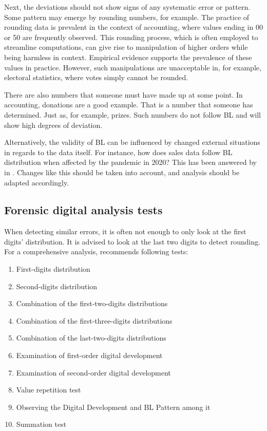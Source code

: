 Next, the deviations should not show signs of any systematic error or pattern. Some pattern may emerge by rounding numbers, for example. The practice of rounding data is prevalent in the context of accounting, where values ending in 00 or 50 are frequently observed. This rounding process, which is often employed to streamline computations, can give rise to manipulation of higher orders while being harmless in context. Empirical evidence supports the prevalence of these values in practice. %
However, such manipulations are unacceptable in, for example, electoral statistics, where votes simply cannot be rounded.
\cite{kossovsky2014benford}


There are also numbers that someone must have made up at some point. In accounting, donations are a good example. That is a number that someone has determined. Just as, for example, prizes. Such numbers do not follow BL and will show high degrees of deviation. \cite{kossovsky2014benford}

Alternatively, the validity of BL can be influenced by changed external situations in regards to the data itself. For instance, how does sales data follow BL distribution when affected by the pandemic in 2020? This has been answered by \citeauthor{Hronova2023} in \citeyear{Hronova2023}. Changes like this should be taken into account, and analysis should be adapted accordingly.


\subsection{Forensic digital analysis tests}

When detecting similar errors, it is often not enough to only look at the first digits' distribution. It is advised to look at the last two digits to detect rounding. For a comprehensive analysis, \citeauthor{kossovsky2014benford} recommends following tests:

\begin{enumerate}
    \item First-digits distribution
    \item Second-digits distribution
    \item Combination of the first-two-digits distributions
    \item Combination of the first-three-digits distributions
    \item Combination of the last-two-digits distributions 
    \item Examination of first-order digital development
    \item Examination of second-order digital development
    \item Value repetition test
    \item Observing the Digital Development and BL Pattern among it 
    \item Summation test   
\end{enumerate}

